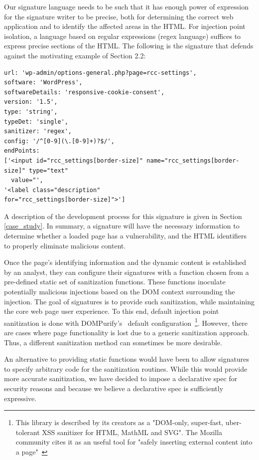  Our signature language needs to be such that it has enough power of
 expression for the signature writer to be precise, both for
 determining the correct web application and to identify the affected
 areas in the HTML. For injection point isolation, a language based on
 regular expressions (regex language) suffices to express precise
 sections of the HTML. The following is the signature that defends
 against the motivating example of Section 2.2:

 \begin{lstlisting}[breaklines=true,caption={An \sys signature},label={lst:xsnare_signature}]
url: 'wp-admin/options-general.php?page=rcc-settings',
software: 'WordPress',
softwareDetails: 'responsive-cookie-consent',
version: '1.5',
type: 'string',
typeDet: 'single',
sanitizer: 'regex',
config: '/^[0-9](\.[0-9]+)?$/',
endPoints: 
['<input id="rcc_settings[border-size]" name="rcc_settings[border-size]" type="text"
  value="',
'<label class="description" 
for="rcc_settings[border-size]">']
\end{lstlisting}

A description of the development process for this signature is given
in Section \ref{case_study}. In summary, a signature will have the
necessary information to determine whether a loaded page has a
vulnerability, and the HTML identifiers to properly eliminate
malicious content.

Once the page's identifying information and the dynamic content is
established by an analyst, they can configure their signatures with a
function chosen from a pre-defined static set of sanitization
functions. These functions inoculate potentially malicious injections
based on the DOM context surrounding the injection. The goal of
signatures is to provide such sanitization, while maintaining the core
web page user experience. To this end, default injection point
sanitization is done with DOMPurify's~\cite{10.1007/978-3-319-66399-9_7} default
configuration~\footnote{This library is described by its creators as a
  "DOM-only, super-fast, uber-tolerant XSS sanitizer for HTML, MathML
  and SVG". The Mozilla community cites it as an useful tool for
  "safely inserting external content into a
  page"~\cite{safecontent}}. However, there are cases where page
functionality is lost due to a generic sanitization approach. Thus, a
different sanitization method can sometimes be more desirable.

An alternative to providing static functions would have been to allow signatures to
specify arbitrary code for the sanitization routines. While this would
provide more accurate sanitization, we have decided to
impose a declarative spec for security reasons and because we believe
a declarative spec is sufficiently expressive.

